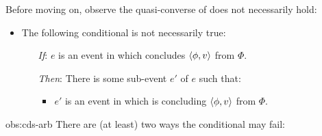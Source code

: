 \begin{note}
  Before moving on, observe the quasi-converse of \assuPP{} does not necessarily hold:

  \begin{observation}
    \label{obs:cds-arb}

    \begin{itemize}
    \item
      The following conditional is not necessarily true:
      \begin{itemize}
      \item[\emph{If}:]
        \(e\) is an event in which \vAgent{} concludes \(\langle \phi, v \rangle\) from \(\Phi\).
      \item[\emph{Then}:]
        There is some sub-event \(e'\) of \(e\) such that:
        \begin{itemize}
        \item
          \(e'\) is an event in which \vAgent{} is concluding \(\langle \phi, v \rangle\) from \(\Phi\).
        \end{itemize}
      \end{itemize}
    \end{itemize}
    \vspace{-\baselineskip}
  \end{observation}

  \begin{argument}{obs:cds-arb}
    There are (at least) two ways the conditional may fail:

    \begin{itemize}[leftmargin=*]



\end{itemize}
\end{argument}
\end{note}
